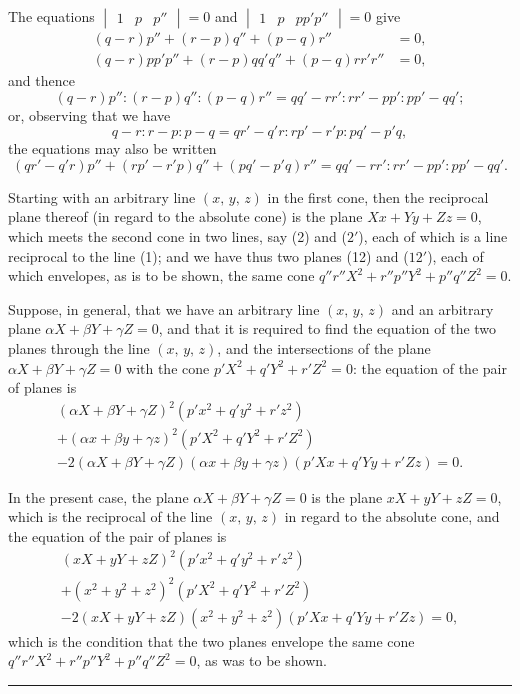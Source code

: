 \documentclass[11pt,a4paper]{article}
\theoremstyle{cayley}
\begin{document}
The equations $\begin{vmatrix}1 & p & p''\end{vmatrix} = 0$ and $\begin{vmatrix}1 & p & pp'p''\end{vmatrix} = 0$ give
\begin{align*}
(q-r)p'' + (r-p)q'' + (p-q)r'' &= 0,\\
(q-r)pp'p'' + (r-p)qq'q'' + (p-q)rr'r'' &= 0,
\end{align*}
and thence
\[
(q-r)p'' : (r-p)q'' : (p-q)r'' = qq' - rr' : rr' - pp' : pp' - qq';
\]
or, observing that we have
\[
q-r : r-p : p-q = qr' - q'r : rp' - r'p : pq' - p'q,
\]
the equations may also be written
\[
(qr' - q'r)p'' + (rp' - r'p)q'' + (pq' - p'q)r'' = qq' - rr' : rr' - pp' : pp' - qq'.
\]

Starting with an arbitrary line $(x,\, y,\, z)$ in the first cone, then the reciprocal plane thereof (in regard to the absolute cone) is the plane $Xx + Yy + Zz = 0$, which meets the second cone in two lines, say (2) and ($2'$), each of which is a line reciprocal to the line (1); and we have thus two planes (12) and ($12'$), each of which envelopes, as is to be shown, the same cone $q''r''X^{2} + r''p''Y^{2} + p''q''Z^{2} = 0$.

Suppose, in general, that we have an arbitrary line $(x,\, y,\, z)$ and an arbitrary plane $\alpha X + \beta Y + \gamma Z = 0$, and that it is required to find the equation of the two planes through the line $(x,\, y,\, z)$, and the intersections of the plane $\alpha X + \beta Y + \gamma Z = 0$ with the cone $p'X^{2} + q'Y^{2} + r'Z^{2} = 0$: the equation of the pair of planes is
\begin{multline*}
(\alpha X + \beta Y + \gamma Z)^{2}(p'x^{2} + q'y^{2} + r'z^{2}) \\
+ (\alpha x + \beta y + \gamma z)^{2}(p'X^{2} + q'Y^{2} + r'Z^{2}) \\
- 2(\alpha X + \beta Y + \gamma Z)(\alpha x + \beta y + \gamma z)(p'Xx + q'Yy + r'Zz) = 0.
\end{multline*}

In the present case, the plane $\alpha X + \beta Y + \gamma Z = 0$ is the plane $xX + yY + zZ = 0$, which is the reciprocal of the line $(x,\, y,\, z)$ in regard to the absolute cone, and the equation of the pair of planes is
\begin{multline*}
(xX + yY + zZ)^{2}(p'x^{2} + q'y^{2} + r'z^{2}) \\
+ (x^{2} + y^{2} + z^{2})^{2}(p'X^{2} + q'Y^{2} + r'Z^{2}) \\
- 2(xX + yY + zZ)(x^{2} + y^{2} + z^{2})(p'Xx + q'Yy + r'Zz) = 0,
\end{multline*}
which is the condition that the two planes envelope the same cone $q''r''X^{2} + r''p''Y^{2} + p''q''Z^{2} = 0$, as was to be shown.

\vspace{1cm}
\begin{center}
\rule{0.5\textwidth}{0.4pt}
\end{center}
\end{document}
